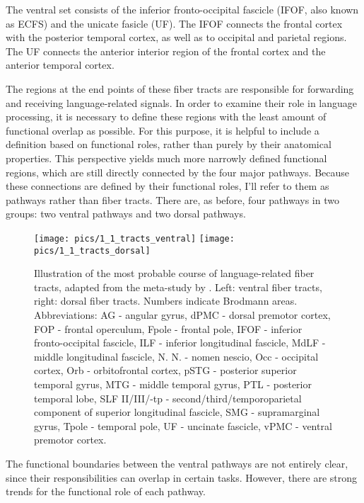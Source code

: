 The ventral set consists of the inferior fronto-occipital fascicle (IFOF, also known as ECFS) and the unicate fasicle (UF).
The IFOF connects the frontal cortex with the posterior temporal cortex, as well as to occipital and parietal regions.
The UF connects the anterior interior region of the frontal cortex and the anterior temporal cortex.

The regions at the end points of these fiber tracts are responsible for forwarding and receiving language-related signals.
In order to examine their role in language processing, it is necessary to define these regions with the least amount of functional overlap as possible.
For this purpose, it is helpful to include a definition based on functional roles, rather than purely by their anatomical properties.
This perspective \cite{1.1.pathways} yields much more narrowly defined functional regions, which are still directly connected by the four major pathways.
Because these connections are defined by their functional roles, I'll refer to them as pathways rather than fiber tracts.
There are, as before, four pathways in two groups: two ventral pathways and two dorsal pathways.

\clearpage

\begin{figure}[h]
\begin{center}
\vspace{7mm}
\texttt{[image: pics/1\_1\_tracts\_ventral]}
\texttt{[image: pics/1\_1\_tracts\_dorsal]}
\caption{\label{1.1.tracts}Illustration of the most probable course of language-related fiber tracts, adapted from the meta-study by \protect\cite{1.1.Gierhan}. Left: ventral fiber tracts, right: dorsal fiber tracts. Numbers indicate Brodmann areas. Abbreviations: AG - angular gyrus, dPMC - dorsal premotor cortex, FOP - frontal operculum, Fpole - frontal pole, IFOF - inferior fronto-occipital fascicle, ILF - inferior longitudinal fascicle, MdLF - middle longitudinal fascicle, N. N. - nomen nescio, Occ - occipital cortex, Orb - orbitofrontal cortex, pSTG - posterior superior temporal gyrus, MTG - middle temporal gyrus, PTL - posterior temporal lobe, SLF II/III/-tp - second/third/temporoparietal component of superior longitudinal fascicle, SMG - supramarginal gyrus, Tpole - temporal pole, UF - uncinate fascicle, vPMC - ventral premotor cortex.}
\end{center}
\end{figure}

The functional boundaries between the ventral pathways are not entirely clear, since their responsibilities can overlap in certain tasks.
However, there are strong trends for the functional role of each pathway.

